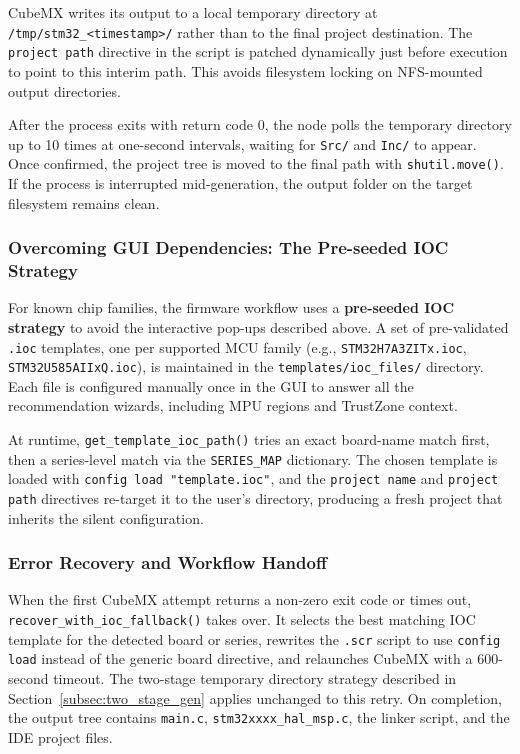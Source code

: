 CubeMX writes its output to a local temporary directory at \texttt{/tmp/stm32\_\textless timestamp\textgreater/} rather than to the final project destination. The \texttt{project path} directive in the script is patched dynamically just before execution to point to this interim path. This avoids filesystem locking on NFS-mounted output directories.

After the process exits with return code 0, the node polls the temporary directory up to 10 times at one-second intervals, waiting for \texttt{Src/} and \texttt{Inc/} to appear. Once confirmed, the project tree is moved to the final path with \texttt{shutil.move()}. If the process is interrupted mid-generation, the output folder on the target filesystem remains clean.

\subsubsection{Overcoming GUI Dependencies: The Pre-seeded IOC Strategy}
\label{subsec:preseeded_ioc}

For known chip families, the firmware workflow uses a \textbf{pre-seeded IOC strategy} to avoid the interactive pop-ups described above. A set of pre-validated \texttt{.ioc} templates, one per supported MCU family (e.g., \texttt{STM32H7A3ZITx.ioc}, \texttt{STM32U585AIIxQ.ioc}), is maintained in the \texttt{templates/ioc\_files/} directory. Each file is configured manually once in the GUI to answer all the recommendation wizards, including MPU regions and TrustZone context.

At runtime, \texttt{get\_\allowbreak template\_\allowbreak ioc\_\allowbreak path()} tries an exact board-name match first, then a series-level match via the \texttt{SERIES\_MAP} dictionary. The chosen template is loaded with \texttt{config load "template.ioc"}, and the \texttt{project name} and \texttt{project path} directives re-target it to the user's directory, producing a fresh project that inherits the silent configuration.

\subsubsection{Error Recovery and Workflow Handoff}

When the first CubeMX attempt returns a non-zero exit code or times out, \texttt{recover\_\allowbreak with\_\allowbreak ioc\_\allowbreak fallback()} takes over. It selects the best matching IOC template for the detected board or series, rewrites the \texttt{.scr} script to use \texttt{config load} instead of the generic board directive, and relaunches CubeMX with a 600-second timeout. The two-stage temporary directory strategy described in Section~\ref{subsec:two_stage_gen} applies unchanged to this retry. On completion, the output tree contains \texttt{main.c}, \texttt{stm32xxxx\_\allowbreak hal\_\allowbreak msp.c}, the linker script, and the IDE project files.

